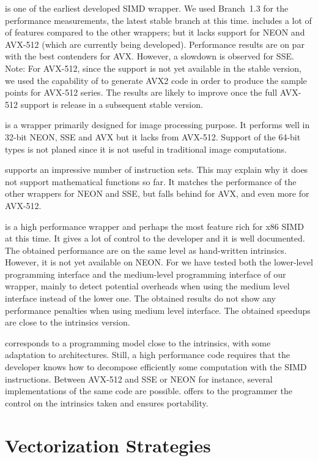 \textbf{\Vc} is one of the earliest developed SIMD \Cxx wrapper. We used
Branch~1.3 for the performance measurements, the latest stable branch at this
time. \Vc includes a lot of of features compared to the other wrappers; but it
lacks support for NEON and AVX-512 (which are currently being developed).
Performance results are on par with the best contenders for AVX. However, a
slowdown is observed for SSE. Note: For AVX-512, since the support is not yet
available in the stable version, we used the capability of \Vc to generate AVX2
code in order to produce the sample points for AVX-512 series. The results are
likely to improve once the full AVX-512 support is release in a subsequent
stable version.

\textbf{\TSIMD} is a wrapper primarily designed for image processing purpose.
It performs well in 32-bit NEON, SSE and AVX but it lacks from AVX-512. Support
of the 64-bit types is not planed since it is not useful in traditional image
computations.

\textbf{\simdpp} supports an impressive number of instruction
sets. This may explain why it does not support mathematical functions so far. It
matches the performance of the other wrappers for NEON and SSE, but falls behind
for AVX, and even more for AVX-512.

\textbf{\VCL} is a high performance wrapper and perhaps the most feature rich
for x86 SIMD at this time. It gives a lot of control to the developer and it is
well documented. The obtained performance are on the same level as hand-written
intrinsics. However, it is not yet available on NEON.
For \MIPP we have tested both the lower-level programming interface and the
medium-level programming interface of our \MIPP wrapper, mainly to detect
potential overheads when using the medium level interface instead of the lower
one. The obtained results do not show any performance penalties when using \MIPP
medium level interface. The obtained speedups are close to the intrinsics
version.

\textbf{\MIPP} corresponds to a programming model close to the intrinsics, with
some adaptation to architectures. Still, a high performance code requires that
the developer knows how to decompose efficiently some computation with the SIMD
instructions. Between AVX-512 and SSE or NEON for instance, several
implementations of the same code are possible. \MIPP offers to the programmer
the control on the intrinsics taken and ensures portability.

\section{Vectorization Strategies}
\label{sec:opt_vec_strat}

